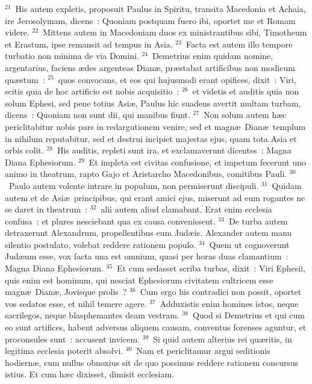 ${}^{21}$~His autem expletis, proposuit Paulus in Spiritu, transita Macedonia et Achaia, ire Jerosolymam, dicens~: Quoniam postquam fuero ibi, oportet me et Romam videre.
${}^{22}$~Mittens autem in Macedoniam duos ex ministrantibus sibi, Timotheum et Erastum, ipse remansit ad tempus in Asia.
${}^{23}$~Facta est autem illo tempore turbatio non minima de via Domini.
${}^{24}$~Demetrius enim quidam nomine, argentarius, faciens \ae des argenteas Dian\ae , pr\ae stabat artificibus non modicum qu\ae stum~:
${}^{25}$~quos convocans, et eos qui hujusmodi erant opifices, dixit~: Viri, scitis quia de hoc artificio est nobis acquisitio~:
${}^{26}$~et videtis et auditis quia non solum Ephesi, sed pene totius Asi\ae , Paulus hic suadens avertit multam turbam, dicens~: Quoniam non sunt dii, qui manibus fiunt.
${}^{27}$~Non solum autem h\ae c periclitabitur nobis pars in redargutionem venire, sed et magn\ae\ Dian\ae\ templum in nihilum reputabitur, sed et destrui incipiet majestas ejus, quam tota Asia et orbis colit.
${}^{28}$~His auditis, repleti sunt ira, et exclamaverunt dicentes~: Magna Diana Ephesiorum.
${}^{29}$~Et impleta est civitas confusione, et impetum fecerunt uno animo in theatrum, rapto Gajo et Aristarcho Macedonibus, comitibus Pauli.
${}^{30}$~Paulo autem volente intrare in populum, non permiserunt discipuli.
${}^{31}$~Quidam autem et de Asi\ae\ principibus, qui erant amici ejus, miserunt ad eum rogantes ne se daret in theatrum~:
${}^{32}$~alii autem aliud clamabant. Erat enim ecclesia confusa~: et plures nesciebant qua ex causa convenissent.
${}^{33}$~De turba autem detraxerunt Alexandrum, propellentibus eum Jud\ae is. Alexander autem manu silentio postulato, volebat reddere rationem populo.
${}^{34}$~Quem ut cognoverunt Jud\ae um esse, vox facta una est omnium, quasi per horas duas clamantium~: Magna Diana Ephesiorum.
${}^{35}$~Et cum sedasset scriba turbas, dixit~: Viri Ephesii, quis enim est hominum, qui nesciat Ephesiorum civitatem cultricem esse magn\ae\ Dian\ae , Jovisque prolis~?
${}^{36}$~Cum ergo his contradici non possit, oportet vos sedatos esse, et nihil temere agere.
${}^{37}$~Adduxistis enim homines istos, neque sacrilegos, neque blasphemantes deam vestram.
${}^{38}$~Quod si Demetrius et qui cum eo sunt artifices, habent adversus aliquem causam, conventus forenses aguntur, et proconsules sunt~: accusent invicem.
${}^{39}$~Si quid autem alterius rei qu\ae ritis, in legitima ecclesia poterit absolvi.
${}^{40}$~Nam et periclitamur argui seditionis hodiern\ae , cum nullus obnoxius sit de quo possimus reddere rationem concursus istius. Et cum h\ae c dixisset, dimisit ecclesiam.

